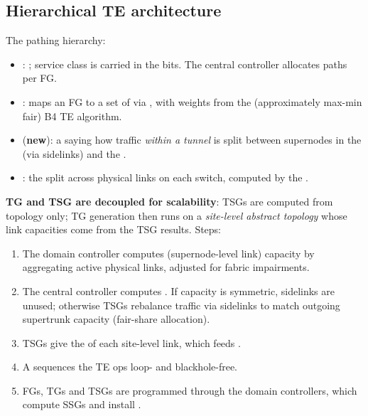 \subsection{Hierarchical TE architecture}
The pathing hierarchy:
\begin{itemize}
\item {}: ; service class is carried in the  bits. The central controller allocates paths per FG.
\item {}: maps an FG to a set of  via , with weights from the (approximately max-min fair) B4 TE algorithm.
\item {} (\textbf{new}): a  saying how traffic \emph{within a tunnel} is split between supernodes in the  (via sidelinks) and the .
\item {}: the split across physical links on each switch, computed by the .
\end{itemize}
\textbf{TG and TSG are decoupled for scalability}: TSGs are computed from topology only; TG generation then runs on a \emph{site-level abstract topology} whose link capacities come from the TSG results. Steps:
\begin{enumerate}
\item The domain controller computes  (supernode-level link) capacity by aggregating active physical links, adjusted for fabric impairments.
\item The central controller computes . If capacity is symmetric, sidelinks are unused; otherwise TSGs rebalance traffic via sidelinks to match outgoing supertrunk capacity (fair-share allocation).
\item TSGs give the  of each site-level link, which feeds .
\item A  sequences the TE ops loop- and blackhole-free.
\item FGs, TGs and TSGs are programmed through the domain controllers, which compute SSGs and install .
\end{enumerate}

